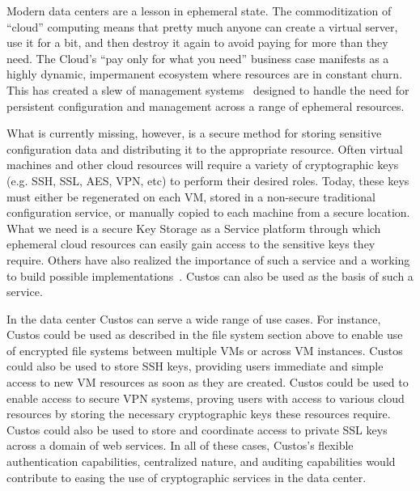 Modern data centers are a lesson in ephemeral state. The
commoditization of ``cloud'' computing means that pretty much anyone
can create a virtual server, use it for a bit, and then destroy it
again to avoid paying for more than they need. The Cloud's ``pay only
for what you need'' business case manifests as a highly dynamic,
impermanent ecosystem where resources are in constant churn. This has
created a slew of management systems~\cite{chef, salt, puppet}
designed to handle the need for persistent configuration and
management across a range of ephemeral resources.

What is currently missing, however, is a secure method for storing
sensitive configuration data and distributing it to the appropriate
resource. Often virtual machines and other cloud resources will
require a variety of cryptographic keys (e.g. SSH, SSL, AES, VPN, etc)
to perform their desired roles. Today, these keys must either be
regenerated on each VM, stored in a non-secure traditional
configuration service, or manually copied to each machine from a
secure location. What we need is a secure Key Storage as a Service
platform through which ephemeral cloud resources can easily gain
access to the sensitive keys they require. Others have also realized
the importance of such a service and a working to build possible
implementations~\cite{cloudkeep-presentation, cloudkeep,
  gazzang}. Custos can also be used as the basis of such a service.

In the data center Custos can serve a wide range of use cases. For
instance, Custos could be used as described in the file system section
above to enable use of encrypted file systems between multiple VMs or
across VM instances. Custos could also be used to store SSH keys,
providing users immediate and simple access to new VM resources as
soon as they are created. Custos could be used to enable access to
secure VPN systems, proving users with access to various cloud
resources by storing the necessary cryptographic keys these resources
require. Custos could also be used to store and coordinate access to
private SSL keys across a domain of web services. In all of these
cases, Custos's flexible authentication capabilities, centralized
nature, and auditing capabilities would contribute to easing the use
of cryptographic services in the data center.

